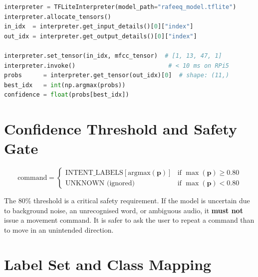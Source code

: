 \documentclass[12pt, a4paper]{report}
\begin{document}
\begin{lstlisting}[language=Python, caption={TFLite inference flow}]
interpreter = TFLiteInterpreter(model_path="rafeeq_model.tflite")
interpreter.allocate_tensors()
in_idx  = interpreter.get_input_details()[0]["index"]
out_idx = interpreter.get_output_details()[0]["index"]

interpreter.set_tensor(in_idx, mfcc_tensor)  # [1, 13, 47, 1]
interpreter.invoke()                          # < 10 ms on RPi5
probs      = interpreter.get_tensor(out_idx)[0]  # shape: (11,)
best_idx   = int(np.argmax(probs))
confidence = float(probs[best_idx])
\end{lstlisting}

\section{Confidence Threshold and Safety Gate}

\begin{equation}
  \text{command} =
  \begin{cases}
    \text{INTENT\_LABELS}[\text{argmax}(\mathbf{p})] & \text{if } \max(\mathbf{p}) \geq 0.80 \\
    \text{UNKNOWN (ignored)}                          & \text{if } \max(\mathbf{p}) < 0.80
  \end{cases}
\end{equation}

The 80\% threshold is a critical safety requirement. If the model is uncertain due to
background noise, an unrecognised word, or ambiguous audio, it \textbf{must not} issue
a movement command. It is safer to ask the user to repeat a command than to move in an
unintended direction.

\section{Label Set and Class Mapping}
\end{document}

